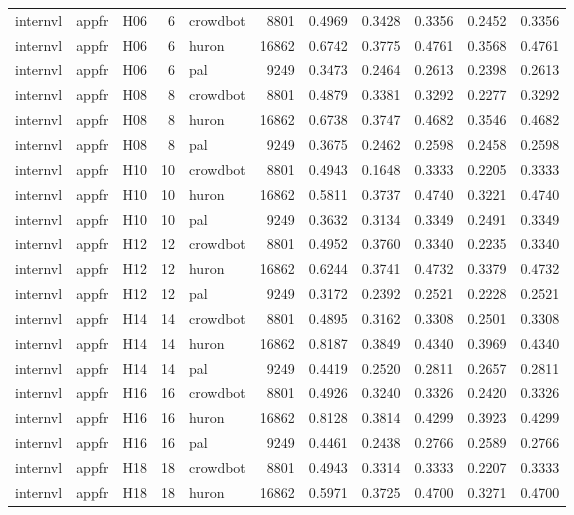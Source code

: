 \begin{table}[tbp]
\begin{tabular}{lllrlrrrrrr}
internvl & appfr & H06 & 6 & crowdbot & 8801 & 0.4969 & 0.3428 & 0.3356 & 0.2452 & 0.3356 \\
internvl & appfr & H06 & 6 & huron & 16862 & 0.6742 & 0.3775 & 0.4761 & 0.3568 & 0.4761 \\
internvl & appfr & H06 & 6 & pal & 9249 & 0.3473 & 0.2464 & 0.2613 & 0.2398 & 0.2613 \\
internvl & appfr & H08 & 8 & crowdbot & 8801 & 0.4879 & 0.3381 & 0.3292 & 0.2277 & 0.3292 \\
internvl & appfr & H08 & 8 & huron & 16862 & 0.6738 & 0.3747 & 0.4682 & 0.3546 & 0.4682 \\
internvl & appfr & H08 & 8 & pal & 9249 & 0.3675 & 0.2462 & 0.2598 & 0.2458 & 0.2598 \\
internvl & appfr & H10 & 10 & crowdbot & 8801 & 0.4943 & 0.1648 & 0.3333 & 0.2205 & 0.3333 \\
internvl & appfr & H10 & 10 & huron & 16862 & 0.5811 & 0.3737 & 0.4740 & 0.3221 & 0.4740 \\
internvl & appfr & H10 & 10 & pal & 9249 & 0.3632 & 0.3134 & 0.3349 & 0.2491 & 0.3349 \\
internvl & appfr & H12 & 12 & crowdbot & 8801 & 0.4952 & 0.3760 & 0.3340 & 0.2235 & 0.3340 \\
internvl & appfr & H12 & 12 & huron & 16862 & 0.6244 & 0.3741 & 0.4732 & 0.3379 & 0.4732 \\
internvl & appfr & H12 & 12 & pal & 9249 & 0.3172 & 0.2392 & 0.2521 & 0.2228 & 0.2521 \\
internvl & appfr & H14 & 14 & crowdbot & 8801 & 0.4895 & 0.3162 & 0.3308 & 0.2501 & 0.3308 \\
internvl & appfr & H14 & 14 & huron & 16862 & 0.8187 & 0.3849 & 0.4340 & 0.3969 & 0.4340 \\
internvl & appfr & H14 & 14 & pal & 9249 & 0.4419 & 0.2520 & 0.2811 & 0.2657 & 0.2811 \\
internvl & appfr & H16 & 16 & crowdbot & 8801 & 0.4926 & 0.3240 & 0.3326 & 0.2420 & 0.3326 \\
internvl & appfr & H16 & 16 & huron & 16862 & 0.8128 & 0.3814 & 0.4299 & 0.3923 & 0.4299 \\
internvl & appfr & H16 & 16 & pal & 9249 & 0.4461 & 0.2438 & 0.2766 & 0.2589 & 0.2766 \\
internvl & appfr & H18 & 18 & crowdbot & 8801 & 0.4943 & 0.3314 & 0.3333 & 0.2207 & 0.3333 \\
internvl & appfr & H18 & 18 & huron & 16862 & 0.5971 & 0.3725 & 0.4700 & 0.3271 & 0.4700 \\

\end{tabular}
\end{table}
